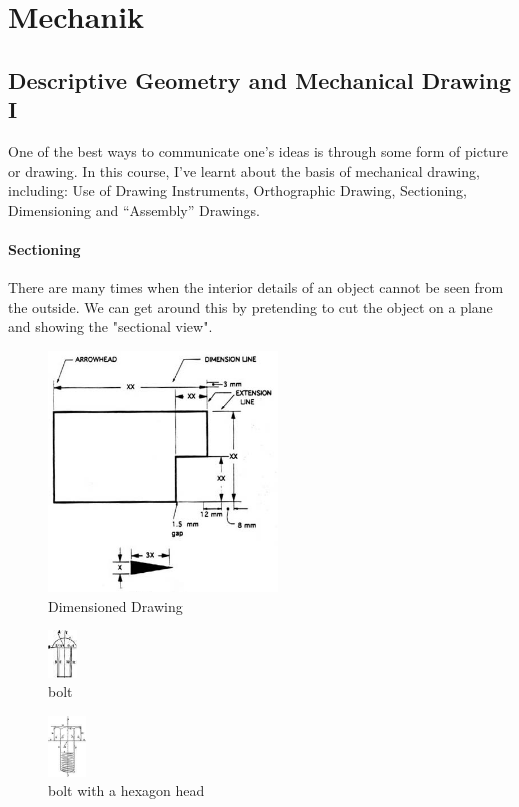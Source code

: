 \section{Mechanik}
\subsection{Descriptive Geometry and Mechanical Drawing I}
One of the best ways to communicate one's ideas is through some form of picture or drawing. In this course, I've learnt about the basis of mechanical drawing, including: Use of Drawing Instruments, Orthographic Drawing, Sectioning, Dimensioning and ``Assembly'' Drawings.
\paragraph{Sectioning} There are many times when the interior details of an object cannot be seen from the outside. We can get around this by pretending to cut the object on a plane and showing the "sectional view".
\begin{figure}
  \centering
  \includegraphics[width=2.4in]{fig/fig_dimensioned.jpg}
  \caption{Dimensioned Drawing}\label{fig_Dimensioned_Drawing}
\end{figure}

\begin{figure}
  \centering
  \includegraphics[width=0.3in]{fig/drawing-0111-2.jpg}
  \caption{bolt}\label{fig_bolt}
\end{figure}

\begin{figure}
  \centering
  \includegraphics[width=0.4in]{fig/drawing-0112-1.jpg}
  \caption{bolt with a hexagon head}\label{fig_bolt1}
\end{figure}

